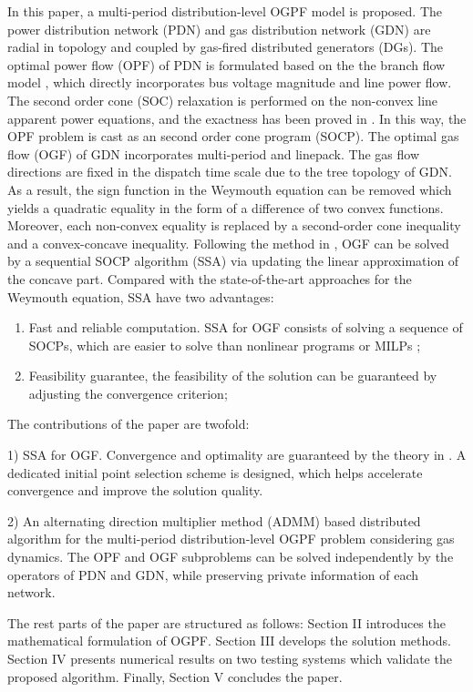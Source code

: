 \documentclass[journal]{IEEEtran}
\begin{document}
In this paper, a multi-period distribution-level OGPF model is proposed. The power distribution network (PDN) and gas distribution network (GDN) are radial in topology and coupled by gas-fired distributed generators (DGs). The optimal power flow (OPF) of PDN is formulated based on the the branch flow model \cite{Wu_Branch,Wu_Branch2}, which directly incorporates bus voltage magnitude and line power flow. The second order cone (SOC) relaxation \cite{Low_PDN_SOCP} is performed on the non-convex line apparent power equations, and the exactness has been proved in \cite{Na_SOCP_Exact}. In this way, the OPF problem is cast as an second order cone program (SOCP). The optimal gas flow (OGF) of GDN incorporates multi-period and linepack. The gas flow directions are fixed in the dispatch time scale \cite{Nico_SingleDirection} due to the tree topology of GDN. As a result, the sign function in the Weymouth equation can be removed which yields a quadratic equality in the form of a difference of two convex functions. Moreover, each non-convex equality is replaced by a second-order cone inequality and a convex-concave inequality. Following the method in \cite{Boyd_CCP}, OGF can be solved by a sequential SOCP algorithm (SSA) via updating the linear approximation of the concave part. Compared with the state-of-the-art approaches for the Weymouth equation, SSA have two advantages:
\begin{enumerate}
\item Fast and reliable computation. SSA for OGF consists of solving a sequence of SOCPs, which are easier to solve than nonlinear programs or MILPs ;
\item Feasibility guarantee, the feasibility of the solution can be guaranteed by adjusting the convergence criterion;
\end{enumerate}

The contributions of the paper are twofold:

1) SSA for OGF. Convergence and optimality are guaranteed by the theory in \cite{Boyd_CCP}. A dedicated initial point selection scheme is designed, which helps accelerate convergence and improve the solution quality.

2) An alternating direction multiplier method (ADMM) based distributed algorithm for the multi-period distribution-level OGPF problem considering gas dynamics. The OPF and OGF subproblems can be solved independently by the operators of PDN and GDN, while preserving private information of each network.

The rest parts of the paper are structured as follows: Section II introduces the mathematical formulation of OGPF. Section III develops the solution methods. Section IV presents numerical results on two testing systems which validate the proposed algorithm. Finally, Section V concludes the paper.
\end{document}
